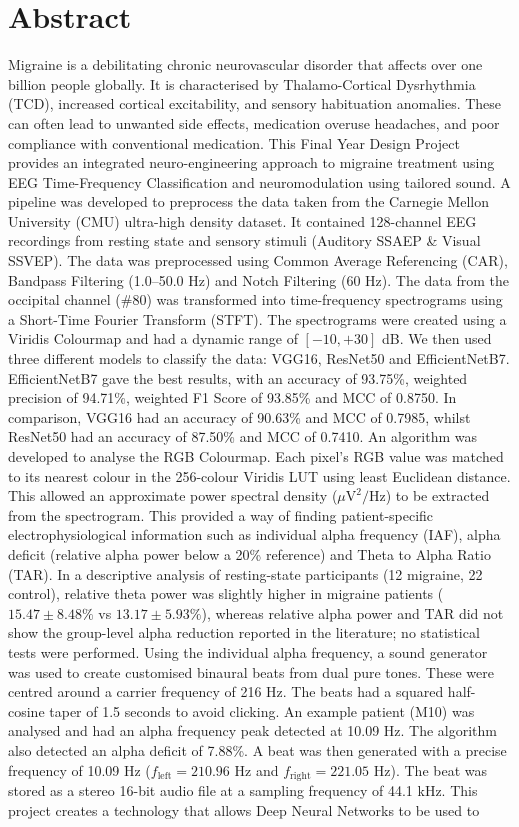 \documentclass[12pt, a4paper]{report}
\begin{document}
\chapter*{Abstract}
Migraine is a debilitating chronic neurovascular disorder that affects over one billion people globally. It is characterised by Thalamo-Cortical Dysrhythmia (TCD), increased cortical excitability, and sensory habituation anomalies. These can often lead to unwanted side effects, medication overuse headaches, and poor compliance with conventional medication. This Final Year Design Project provides an integrated neuro-engineering approach to migraine treatment using EEG Time-Frequency Classification and neuromodulation using tailored sound. A pipeline was developed to preprocess the data taken from the Carnegie Mellon University (CMU) ultra-high density dataset. It contained 128-channel EEG recordings from resting state and sensory stimuli (Auditory SSAEP \& Visual SSVEP). The data was preprocessed using Common Average Referencing (CAR), Bandpass Filtering (1.0--50.0 Hz) and Notch Filtering (60 Hz). The data from the occipital channel (\#80) was transformed into time-frequency spectrograms using a Short-Time Fourier Transform (STFT). The spectrograms were created using a Viridis Colourmap and had a dynamic range of $[-10, +30]$ dB. We then used three different models to classify the data: VGG16, ResNet50 and EfficientNetB7. EfficientNetB7 gave the best results, with an accuracy of 93.75\%, weighted precision of 94.71\%, weighted F1 Score of 93.85\% and MCC of 0.8750. In comparison, VGG16 had an accuracy of 90.63\% and MCC of 0.7985, whilst ResNet50 had an accuracy of 87.50\% and MCC of 0.7410. An algorithm was developed to analyse the RGB Colourmap. Each pixel's RGB value was matched to its nearest colour in the 256-colour Viridis LUT using least Euclidean distance. This allowed an approximate power spectral density ($\mu\text{V}^2/\text{Hz}$) to be extracted from the spectrogram. This provided a way of finding patient-specific electrophysiological information such as individual alpha frequency (IAF), alpha deficit (relative alpha power below a 20\% reference) and Theta to Alpha Ratio (TAR). In a descriptive analysis of resting-state participants (12 migraine, 22 control), relative theta power was slightly higher in migraine patients ($15.47 \pm 8.48\%$ vs $13.17 \pm 5.93\%$), whereas relative alpha power and TAR did not show the group-level alpha reduction reported in the literature; no statistical tests were performed. Using the individual alpha frequency, a sound generator was used to create customised binaural beats from dual pure tones. These were centred around a carrier frequency of 216 Hz. The beats had a squared half-cosine taper of 1.5 seconds to avoid clicking. An example patient (M10) was analysed and had an alpha frequency peak detected at 10.09 Hz. The algorithm also detected an alpha deficit of 7.88\%. A beat was then generated with a precise frequency of 10.09 Hz ($f_{\text{left}} = 210.96$ Hz and $f_{\text{right}} = 221.05$ Hz). The beat was stored as a stereo 16-bit audio file at a sampling frequency of 44.1 kHz. This project creates a technology that allows Deep Neural Networks to be used to 
\end{document}
